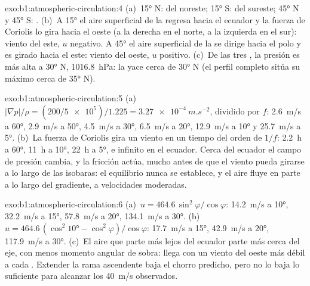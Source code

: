 \begin{solution}{exo:b1:atmospheric-circulation:4}
(a)~\ang{15} N:  del noreste; \ang{15} S:  del sureste; \ang{45} N y \ang{45} S: . (b)~A \ang{15} el aire superficial de la  regresa hacia el ecuador y la fuerza de Coriolis lo gira hacia el oeste (a la derecha en el norte, a la izquierda en el sur): viento del este, $u$ negativo. A \ang{45} el aire superficial de la  se dirige hacia el polo y es girado hacia el este: viento del oeste, $u$ positivo. (c)~De las tres , la presión es más alta a \ang{30} N, \qty{1016.8}{hPa}: la  yace cerca de \ang{30} N (el perfil completo sitúa su máximo cerca de \ang{35} N).
\end{solution}

\begin{solution}{exo:b1:atmospheric-circulation:5}
(a)~$|\nabla p|/\rho = (200/\num{5e5})/1.225 = \qty{3.27e-4}{m.s^{-2}}$, dividido por
$f$: \qty{2.6}{m/s} a \ang{60}, \qty{2.9}{m/s} a \ang{50}, \qty{4.5}{m/s} a
\ang{30}, \qty{6.5}{m/s} a \ang{20}, \qty{12.9}{m/s} a \ang{10} y
\qty{25.7}{m/s} a \ang{5}. (b)~La fuerza de Coriolis gira un viento en un tiempo del orden de
$1/f$: \qty{2.2}{h} a \ang{60}, \qty{11}{h} a \ang{10}, \qty{22}{h} a \ang{5}, e infinito en el ecuador. Cerca del ecuador el campo de presión cambia, y la fricción actúa, mucho antes de que el viento pueda girarse a lo largo de las isobaras: el equilibrio nunca se establece, y el aire fluye en parte a lo largo del gradiente, a velocidades moderadas.
\end{solution}

\begin{solution}{exo:b1:atmospheric-circulation:6}
(a)~$u = 464.6\,\sin^2\varphi/\cos\varphi$: \qty{14.2}{m/s} a \ang{10},
\qty{32.2}{m/s} a \ang{15}, \qty{57.8}{m/s} a \ang{20}, \qty{134.1}{m/s} a
\ang{30}. (b)~$u = 464.6\,(\cos^2\ang{10} - \cos^2\varphi)/\cos\varphi$:
\qty{17.7}{m/s} a \ang{15}, \qty{42.9}{m/s} a \ang{20}, \qty{117.9}{m/s} a
\ang{30}. (c)~El aire que parte más lejos del ecuador parte más cerca del eje, con menos momento angular de sobra: llega con un viento del oeste más débil a cada . Extender la rama ascendente baja el chorro predicho, pero no lo baja lo suficiente para alcanzar los \qty{40}{m/s} observados.
\end{solution}

